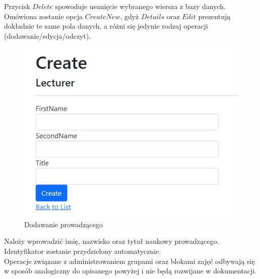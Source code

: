 \documentclass[]{article}
\begin{document}
Przycisk $Delete$ spowoduje usunięcie wybranego wiersza z bazy danych. Omówiona zostanie opcja $Create New$, gdyż $Details$ oraz $Edit$ prezentują dokładnie te same pola danych, a różni się jedynie rodzaj operacji (dodawanie/edycja/odczyt).
\begin{figure}[H]
	\centering
	\includegraphics[scale=0.6]{lecturers-create}
	\caption{Dodawanie prowadzącego}
\end{figure}
Należy wprowadzić imię, nazwisko oraz tytuł naukowy prowadzącego. Identyfikator zostanie przydzielony automatycznie. \\

Operacje związane z administrowaniem grupami oraz blokami zajęć odbywają się w sposób analogiczny do opisanego powyżej i nie będą rozwijane w dokumentacji.
\end{document}

